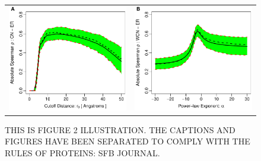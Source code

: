 \documentclass[12pt]{article}
\begin{document}
    \begin{figure}
        \begin{center}
        \begin{tabular}{cc}
            \includegraphics[width=3.1in]{spcor_cnSC_r4sJC.pdf} & \includegraphics[width=3.1in]{spcor_cnwSC_r4sJC.pdf}
        \end{tabular}
        \end{center}
        \caption{THIS IS FIGURE 2 ILLUSTRATION. THE CAPTIONS AND FIGURES HAVE BEEN SEPARATED TO COMPLY WITH THE RULES OF PROTEINS: SFB JOURNAL.}
        \label{fig:cnwcnp}
    \end{figure}
\end{document}
